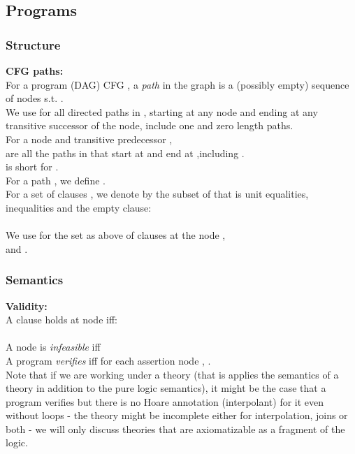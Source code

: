 \subsection{Programs}
\subsubsection{Structure}
\noindent
\textbf{CFG paths:}\\
For a program (DAG) CFG , a \emph{path} in the graph is a (possibly empty) sequence  of nodes s.t. .\\
We use  for all directed paths in , starting at any node and ending at any transitive successor of the node, include one and zero length paths.\\
For a node  and transitive predecessor ,\\
 are all the paths in  that start at  and end at ,including .\\
 is short for .\\
For a path , we define .\\
For a set of clauses , we denote by  the subset of  that is unit equalities, inequalities and the empty clause:\\
\\
We use  for the set as above of clauses at the node , \\
and .


\subsubsection{Semantics}
\textbf{Validity:}\\
A clause  holds at node  iff: \\
 \\
A node  is \emph{infeasible} iff \\
A program \emph{verifies} iff for each assertion node , .\\
Note that if we are working under a theory (that is \m{\models} applies the semantics of a theory in addition to the pure logic semantics), it might be the case that a program verifies but there is no Hoare annotation (interpolant) for it even without loops - the theory might be incomplete either for interpolation, joins or both - we will only discuss theories that are axiomatizable as a fragment of the logic.


